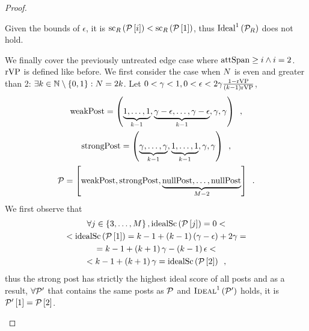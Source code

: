 \begin{proof}
\begin{itemize}
    Given the bounds of $\epsilon$, it is
    $\mathrm{sc}_{R}\left(\mathcal{P}\left[i\right]\right) <
    \mathrm{sc}_{R}\left(\mathcal{P}\left[1\right]\right)$, thus
    $\mathrm{Ideal}^1\left(\mathcal{P}_{R}\right)$ does not hold.

    We finally cover the previously untreated edge case where $\mathrm{attSpan} \geq i
    \wedge i = 2$. $\mathrm{rVP}$ is defined like before. We first consider the case
    when $N$ is even and greater than 2: $\exists k \in \mathbb{N}
    \setminus \left\{0, 1\right\}: N = 2k$. Let $0 < \gamma < 1, 0 <
    \epsilon < 2 \gamma \frac{1 - \mathrm{rVP}}{\left(k - 1\right)\mathrm{rVP}}$,
    \begin{gather*}
      \mathrm{weakPost} = \left(\underbrace{1, \dots, 1}_{k - 1}, \underbrace{\gamma -
      \epsilon, \dots, \gamma - \epsilon}_{k - 1}, \gamma, \gamma\right)
      \enspace, \\
      \mathrm{strongPost} = \left(\underbrace{\gamma, \dots, \gamma}_{k - 1},
      \underbrace{1, \dots, 1}_{k - 1}, \gamma, \gamma\right) \enspace, \\
      \mathcal{P} = \left[\mathrm{weakPost}, \mathrm{strongPost}, \underbrace{\mathrm{nullPost}, \dots,
      \mathrm{nullPost}}_{M - 2}\right] \enspace.
    \end{gather*}
    We first observe that
    \begin{gather*}
      \forall j \in \left\{3, \dots, M\right\},
      \mathrm{idealSc}\left(\mathcal{P}\left[j\right]\right) = 0 < \\
      < \mathrm{idealSc}\left(\mathcal{P}\left[1\right]\right) = k - 1 + \left(k - 1\right)\left(\gamma
      - \epsilon\right) + 2\gamma = \\
      = k - 1 + \left(k + 1\right)\gamma - \left(k - 1\right)\epsilon < \\
      < k - 1 + \left(k + 1\right)\gamma = \mathrm{idealSc}\left(\mathcal{P}\left[2\right]\right)
      \enspace,
    \end{gather*}
    thus the strong post has strictly the highest ideal score of all posts and
    as a result, $\forall \mathcal{P}'$ that contains the same posts as
    $\mathcal{P}$ and $\textsc{Ideal}^1\left(\mathcal{P}'\right)$ holds, it is
    $\mathcal{P}'\left[1\right] = \mathcal{P}\left[2\right]$.


\end{itemize}
\end{proof}
